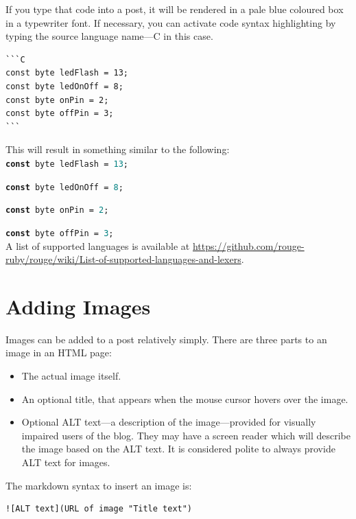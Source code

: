 If you type that code into a post, it will be rendered in a pale blue coloured box in a typewriter font.  If necessary, you can activate code syntax highlighting by typing the source language name---C in this case.

\begin{lstlisting}[caption={Source code.},style=myText]
```C
const byte ledFlash = 13;
const byte ledOnOff = 8;
const byte onPin = 2;
const byte offPin = 3;
```
\end{lstlisting}

This will result in something similar to the following:\\

\texttt{\textbf{const} byte ledFlash = \textcolor{teal}{13};}

\texttt{\textbf{const} byte ledOnOff = \textcolor{teal}{8};}

\texttt{\textbf{const} byte onPin = \textcolor{teal}{2};}

\texttt{\textbf{const} byte offPin = \textcolor{teal}{3};}\\

A list of supported languages is available at \url{https://github.com/rouge-ruby/rouge/wiki/List-of-supported-languages-and-lexers}.


\section{Adding Images}\label{sect: Adding Images}

Images can be added to a post relatively simply. There are three parts to an image in an HTML page:

\begin{itemize}
    \item The actual image itself.
    \item An optional title, that appears when the mouse cursor hovers over the image.
    \item Optional ALT text---a description of the image---provided for visually impaired users of the blog. They may have a screen reader which will describe the image based on the ALT text. It is considered polite to always provide ALT text for images.
\end{itemize}

The markdown syntax to insert an image is:

\begin{lstlisting}[style=myText]
![ALT text](URL of image "Title text")
\end{lstlisting}

